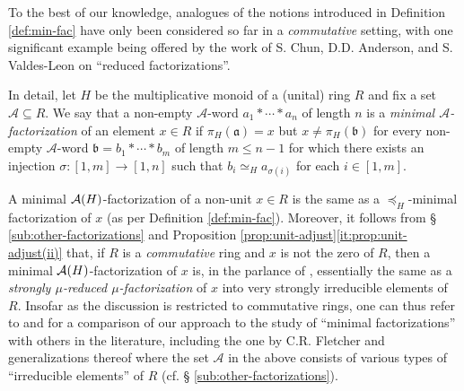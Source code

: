 \begin{rk} \label{rem:chun&anderson}
To the best of our knowledge, analogues of the notions introduced in Definition \ref{def:min-fac} have only been considered so far in a \emph{commutative} setting, with one significant example being offered by the work of S. Chun, D.D. Anderson, and S. Valdes-Leon \cite{chun-anderson-vl11} on ``reduced factorizations''.

In detail, let $H$ be the multiplicative monoid of a (unital) ring $R$ and fix a set $\mathcal A \subseteq R$.
We say that a non-empty $\mathcal A$-word $a_1 \ast \cdots \ast a_n$ of length $n$ is a \emph{minimal $\mathcal A$-factorization} of an element $x \in R$ if $\pi_H(\mathfrak a) = x$ but $x \ne \pi_H(\mathfrak b)$ for every non-empty $\mathcal A$-word $\mathfrak b = b_1 \ast \cdots \ast b_m$ of length $m \le n-1$ for which there exists an injection $\sigma: [ 1, m ] \to [ 1, n ]$ such that $b_i \simeq_H a_{\sigma(i)}$ for each $i \in [ 1, m ]$. 

A minimal $\mathcal{A}(H)$-factorization of a non-unit $x \in R$ is the same as a $\preceq_H$-minimal factorization of $x$ (as per Definition \ref{def:min-fac}). Moreover, it follows from \S{ }\ref{sub:other-factorizations} and Proposition \ref{prop:unit-adjust}\ref{it:prop:unit-adjust(ii)} that, if $R$ is a \emph{commutative} ring and $x$ is not the zero of $R$, then a minimal $\mathcal{A}(H)$-factorization of $x$ is, in the parlance of \cite[Definition 2.1 and \S{ }3]{chun-anderson-vl11}, essentially the same as a \emph{strongly $\mu$-reduced $\mu$-factorization} of $x$ into very strongly irreducible elements of $R$. 
Insofar as the discussion is restricted to commutative rings, one can thus refer to \cite{chun-anderson-vl11} and \cite{axtell-et-al03} for a comparison of our approach to the study of ``minimal factorizations'' with others in the literature, including the one by C.R. Fletcher \cite{fletcher69} and generalizations thereof where the set $\mathcal A$ in the above consists of various types of ``irreducible elements'' of $R$ (cf. \S{ }\ref{sub:other-factorizations}).
\end{rk}

